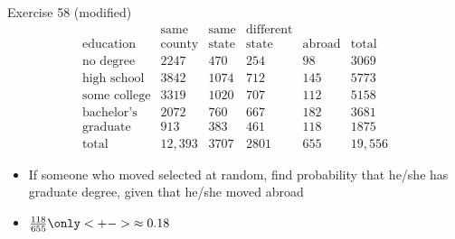 \documentclass[handout]{beamer}
\theoremstyle{definition}
\begin{document}
\begin{frame}{Exercise 58 (modified)}
\[\begin{array}{r|llll|l}
&\text{same}&\text{same}&\text{different}&&\\
\text{education}&\text{county}
&\text{state}&\text{state}&\text{abroad}&\text{total}\\\hline
\text{no degree}&2247&470&254&98&3069\\
\text{high school}&3842&1074&712&145&5773\\
\text{some college}&3319&1020&707&112&5158\\
\text{bachelor's}&2072&760&667&182&3681\\
\text{graduate}&913&383&461&118&1875\\\hline
\text{total}&12,393&3707&2801&655&19,556
\end{array}\]
\begin{itemize}
\item If someone who moved selected at random, find probability
that he/she has graduate degree, given that he/she moved abroad
\item $\frac{118}{655}\only<+->{\approx 0.18}$
\end{itemize}
\end{frame}
\end{document}
